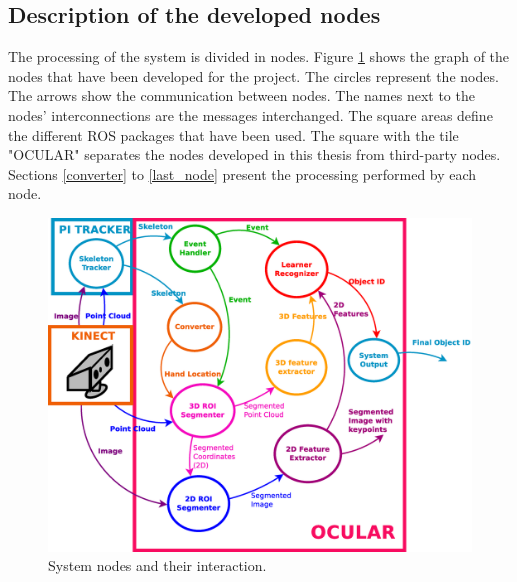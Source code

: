 \subsection{Description of the developed nodes}
\label{nodes}


The processing of the system is divided in nodes. 
Figure \ref{nodes_graph} shows the graph of the nodes that have been developed for the project.
The circles represent the nodes. %
The arrows show the communication between nodes. 
The names next to the nodes' interconnections are the messages interchanged.  %
The square areas define the different ROS packages that have been used.
The square with the tile "OCULAR" separates the nodes developed in this thesis from third-party nodes. 
Sections \ref{converter} to \ref{last_node} present the processing performed by each node. 
\\


		\begin{figure}[H]
			\begin{center}
			\includegraphics[width=\linewidth]{img/diagrams/nodes.eps}
			\caption[System nodes]{System nodes and their interaction.}
			\label{nodes_graph}

			\end{center}
		\end{figure}

